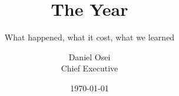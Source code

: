 \documentclass[aspectratio=169,11pt]{beamer}
\title{The Year}
\subtitle{What happened, what it cost, what we learned}
\author{Daniel Osei \\ \small Chief Executive}
\date{\today}
\begin{document}
\titleslide





\end{document}
